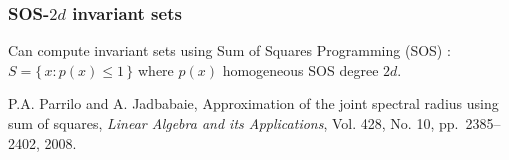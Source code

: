 \documentclass{beamer}
\begin{document}
  \begin{frame}
    \frametitle{SOS-$2d$ invariant sets}
    Can compute invariant sets using Sum of Squares Programming (SOS) :
    $S = \{\, x : p(x) \leq 1\,\}$ where $p(x)$ homogeneous %
    SOS degree $2d$.

    \vfill
    {\scriptsize
    P.A. Parrilo and A. Jadbabaie,
    Approximation of the joint spectral radius using sum of squares,
    \emph{Linear Algebra and its Applications},
    Vol. 428, No. 10, pp.~2385--2402, 2008.
    }
  \end{frame}
\end{document}
